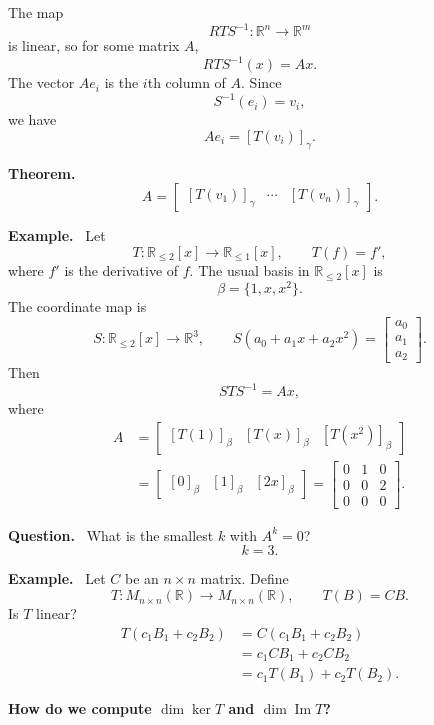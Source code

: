 \documentclass[letterpaper]{article}
\newcommand{\noteheader}[1]{\par\medskip\noindent\textbf{#1}\ }
\begin{document}
The map
\[
RTS^{-1}:\mathbb{R}^n\to\mathbb{R}^m
\]
is linear, so for some matrix $A$,
\[
RTS^{-1}(x)=Ax.
\]
The vector $Ae_i$ is the $i$th column of $A$. Since
\[
S^{-1}(e_i)=v_i,
\]
we have
\[
Ae_i=[T(v_i)]_\gamma.
\]

\clearpage

\noteheader{Theorem.}
\[
A=\begin{bmatrix}[T(v_1)]_\gamma&\cdots&[T(v_n)]_\gamma\end{bmatrix}.
\]

\bigskip

\noteheader{Example.} Let
\[
T:\mathbb{R}_{\leq2}[x]\to\mathbb{R}_{\leq1}[x],
\qquad T(f)=f',
\]
where $f'$ is the derivative of $f$. The usual basis in $\mathbb{R}_{\leq2}[x]$ is
\[
\beta=\{1,x,x^2\}.
\]
The coordinate map is
\[
S:\mathbb{R}_{\leq2}[x]\to\mathbb{R}^3,
\qquad
S(a_0+a_1x+a_2x^2)=\begin{bmatrix}a_0\\a_1\\a_2\end{bmatrix}.
\]
Then
\[
STS^{-1}=Ax,
\]
where
\begin{align*}
A
&=\begin{bmatrix}[T(1)]_\beta&[T(x)]_\beta&[T(x^2)]_\beta\end{bmatrix}\\
&=\begin{bmatrix}[0]_\beta&[1]_\beta&[2x]_\beta\end{bmatrix}
=\begin{bmatrix}0&1&0\\0&0&2\\0&0&0\end{bmatrix}.
\end{align*}

\bigskip

\noteheader{Question.} What is the smallest $k$ with $A^k=0$?
\[
k=3.
\]

\clearpage

\noteheader{Example.} Let $C$ be an $n\times n$ matrix. Define
\[
T:M_{n\times n}(\mathbb{R})\to M_{n\times n}(\mathbb{R}),
\qquad T(B)=CB.
\]
Is $T$ linear?
\begin{align*}
T(c_1B_1+c_2B_2)
&=C(c_1B_1+c_2B_2)\\
&=c_1CB_1+c_2CB_2\\
&=c_1T(B_1)+c_2T(B_2).
\end{align*}

\noteheader{How do we compute $\dim\ker T$ and $\dim\operatorname{Im}T$?}
\end{document}
